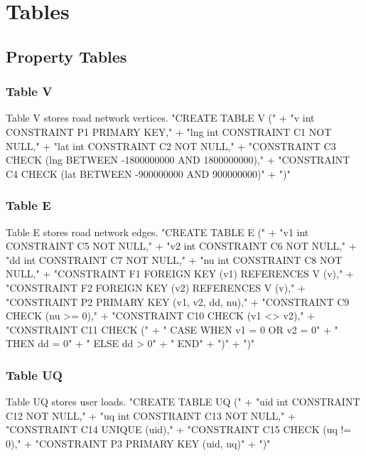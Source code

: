 \chapter{Tables}
\label{tables}

\section{Property Tables}

\subsection{Table V}
Table V stores road network vertices.
\nwenddocs{}\endmoddef{}
"CREATE TABLE V ("
  + "v   int  CONSTRAINT P1 PRIMARY KEY,"
  + "lng int  CONSTRAINT C1 NOT NULL,"
  + "lat int  CONSTRAINT C2 NOT NULL,"
  + "CONSTRAINT C3 CHECK (lng BETWEEN -1800000000 AND 1800000000),"
  + "CONSTRAINT C4 CHECK (lat BETWEEN  -900000000 AND  900000000)"
  + ")"
\nwendcode{}\nwdocspar

\subsection{Table E}
Table E stores road network edges.
\nwenddocs{}\endmoddef{}
"CREATE TABLE E ("
  + "v1  int  CONSTRAINT C5 NOT NULL,"
  + "v2  int  CONSTRAINT C6 NOT NULL,"
  + "dd  int  CONSTRAINT C7 NOT NULL,"
  + "nu  int  CONSTRAINT C8 NOT NULL,"
  + "CONSTRAINT F1 FOREIGN KEY (v1) REFERENCES V (v),"
  + "CONSTRAINT F2 FOREIGN KEY (v2) REFERENCES V (v),"
  + "CONSTRAINT P2 PRIMARY KEY (v1, v2, dd, nu),"
  + "CONSTRAINT C9 CHECK (nu >= 0),"
  + "CONSTRAINT C10 CHECK (v1 <> v2),"
  + "CONSTRAINT C11 CHECK ("
  + "  CASE WHEN v1 = 0 OR v2 = 0"
  + "    THEN dd = 0"
  + "    ELSE dd > 0"
  + "  END"
  + ")"
  + ")"
\nwendcode{}\nwdocspar

\subsection{Table UQ}
Table UQ stores user loads.
\nwenddocs{}\endmoddef{}
"CREATE TABLE UQ ("
  + "uid int  CONSTRAINT C12 NOT NULL,"
  + "uq  int  CONSTRAINT C13 NOT NULL,"
  + "CONSTRAINT C14 UNIQUE (uid),"
  + "CONSTRAINT C15 CHECK (uq != 0),"
  + "CONSTRAINT P3 PRIMARY KEY (uid, uq)"
  + ")"
\nwendcode{}\nwdocspar

